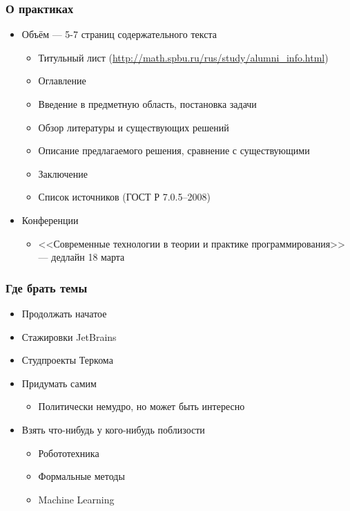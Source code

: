 \documentclass[xetex,mathserif,serif]{beamer}
\begin{document}
	\begin{frame}
		\frametitle{О практиках}
		\begin{itemize}
			\item Объём --- 5-7 страниц содержательного текста
			\begin{itemize}
				\item Титульный лист (\url{http://math.spbu.ru/rus/study/alumni\_info.html})
				\item Оглавление
				\item Введение в предметную область, постановка задачи
				\item Обзор литературы и существующих решений
				\item Описание предлагаемого решения, сравнение с существующими
				\item Заключение
				\item Список источников (ГОСТ Р 7.0.5--2008)
			\end{itemize}
			\item Конференции
			\begin{itemize}
				\item {}<<Современные технологии в теории и практике программирования>> --- дедлайн 18 марта
			\end{itemize}
		\end{itemize}
	\end{frame}

	\begin{frame}
		\frametitle{Где брать темы}
		\begin{itemize}
			\item Продолжать начатое
			\item Стажировки JetBrains
			\item Студпроекты Теркома
			\item Придумать самим 
			\begin{itemize}
				\item Политически немудро, но может быть интересно
			\end{itemize}
			\item Взять что-нибудь у кого-нибудь поблизости
			\begin{itemize}
				\item Робототехника
				\item Формальные методы
				\item Machine Learning
			\end{itemize}
		\end{itemize}
	\end{frame}
\end{document}
